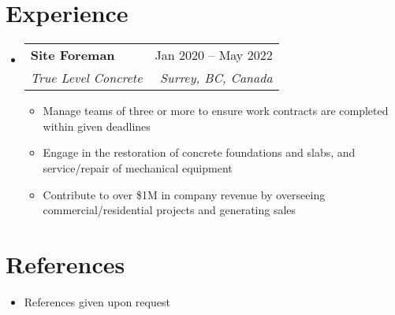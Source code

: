 \documentclass[letterpaper,11pt]{article}
\makeatletter
\newcommand{\resumeItem}[1]{
  \item\small{
    {#1 \vspace{-2pt}}
  }
}
\newcommand{\resumeSubheading}[4]{
  \vspace{-2pt}\item
    \begin{tabular*}{0.97\textwidth}[t]{l@{\extracolsep{\fill}}r}
      \textbf{#1} & #2 \\
      \textit{\small#3} & \textit{\small #4} \\
    \end{tabular*}\vspace{-7pt}
}
\newcommand{\resumeSubSubheading}[2]{
    \item
    \begin{tabular*}{0.97\textwidth}{l@{\extracolsep{\fill}}r}
      \textit{\small#1} & \textit{\small #2} \\
    \end{tabular*}\vspace{-7pt}
}
\newcommand{\resumeSubHeadingListStart}{\begin{itemize}[leftmargin=0.15in, label={}]}
\newcommand{\resumeSubHeadingListEnd}{\end{itemize}}
\newcommand{\resumeItemListStart}{\begin{itemize}}
\newcommand{\resumeItemListEnd}{\end{itemize}\vspace{-5pt}}
\makeatother
\begin{document}
%

\section{Experience}
\resumeSubHeadingListStart

\resumeSubheading
{Site Foreman}{Jan 2020 -- May 2022}
{True Level Concrete}{Surrey, BC, Canada}
\resumeItemListStart
\resumeItem{Manage teams of three or more to ensure work contracts are completed within given deadlines}
\resumeItem{Engage in the restoration of concrete foundations and slabs, and service/repair of mechanical equipment}
\resumeItem{Contribute to over \$1M in company revenue by overseeing commercial/residential projects and generating sales}
\resumeItemListEnd



\resumeSubHeadingListEnd

\section{References}
\resumeItemListStart
\resumeItem{References given upon request}
\resumeItemListEnd


\end{document}
